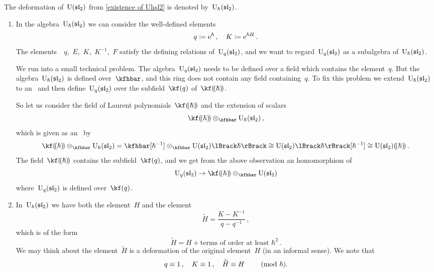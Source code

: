 \documentclass[a4paper, 11pt, oneside]{scrartcl}
\begin{document}
\begin{definition}
  The deformation of~$\operatorname{U}(\mathfrak{sl}_2)$ from \cref{existence of Uhsl2} is denoted by~$\operatorname{U}_{\hbar}(\mathfrak{sl}_2)$.
\end{definition}

\begin{remark}
  \begin{enumerate}
    \item
      In the algebra~$\operatorname{U}_{\hbar}(\mathfrak{sl}_2)$ we can consider the well-defined elements
      \[
        q \coloneqq \mathrm{e}^{\hbar} \,,
        \quad
        K \coloneqq \mathrm{e}^{\hbar H} \,.
      \]
      The elements~~$q$,~$E$,~$K$,~$K^{-1}$,~$F$ satisfy the defining relations of~$\operatorname{U}_q(\mathfrak{sl}_2)$, and we want to regard~$\operatorname{U}_q(\mathfrak{sl}_2)$ as a subalgebra of~$\operatorname{U}_{\hbar}(\mathfrak{sl}_2)$.

      We run into a small technical problem.
      The algebra~$\operatorname{U}_q(\mathfrak{sl}_2)$ needs to be defined over a field which contains the element~$q$.
      But the algebra~$\operatorname{U}_{\hbar}(\mathfrak{sl}_2)$ is defined over~$\kfhbar$, and this ring does not contain any field containing~$q$.
      To fix this problem we extend~$\operatorname{U}_{\hbar}(\mathfrak{sl}_2)$ to an~\algebra{$\lpower{\kf}{\hbar}$} and then define~$\operatorname{U}_q(\mathfrak{sl}_2)$ over the subfield~$\kf(q)$ of~$\lpower{\kf}{\hbar}$.

      So let us consider the field of Laurent polynomials~$\lpower{\kf}{\hbar}$ and the extension of scalars
      \[
        \lpower{\kf}{\hbar} \tensor_{\kfhbar} \Univ_{\hbar}(\sllie_2) \,,
      \]
      which is given as an~\module{$\lpower{\kf}{\hbar}$} by
      \[
        \lpower{\kf}{\hbar} \tensor_{\kfhbar} \Univ_{\hbar}(\sllie_2)
        =
        \kfhbar[\hbar^{-1}] \tensor_{\kfhbar} \power{\Univ(\sllie_2)}{\hbar}
        \cong
        \power{\Univ(\sllie_2)}{\hbar}[\hbar^{-1}]
        \cong
        \lpower{\Univ(\sllie_2)}{\hbar} \,.
      \]
      The field~$\lpower{\kf}{\hbar}$ contains the subfield~$\kf(q)$, and we get from the above observation an homomorphism of~
      \[
        \Univ_q(\sllie_2)
        \to
        \lpower{\kf}{\hbar} \tensor_{\kfhbar} \Univ(\sllie_2)
      \]
      where~$\operatorname{U}_q(\mathfrak{sl}_2)$ is defined over~$\kf(q)$.
    \item
      In~$\operatorname{U}_{\hbar}(\mathfrak{sl}_2)$ we have both the element~$H$ and the element
      \[
        \widetilde{H}
        =
        \frac{K - K^{-1}}{q - q^{-1}} \,,
      \]
      which is of the form
      \[
        \widetilde{H}
        =
        H + \text{terms of order at least~$\hbar^2$} \,.
      \]
      We may think about the element~$\widetilde{H}$ is a deformation of the original element~$H$ (in an informal sense).
      We note that
      \[
        q \equiv 1 \,,
        \quad
        K \equiv 1 \,,
        \quad
        \widetilde{H} \equiv H
        \qquad
        \ (\mathrm{mod}\ \hbar).
      \]
  \end{enumerate}
\end{remark}
\end{document}
